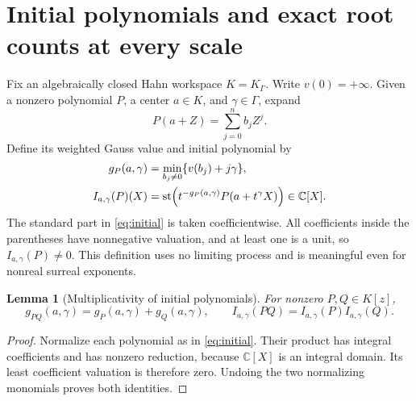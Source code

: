 \documentclass[11pt,letterpaper,oneside]{article}
\numberwithin{equation}{section}
\newtheorem{lemma}[theorem]{Lemma}
\theoremstyle{definition}
\theoremstyle{remark}\newtheorem{remark}[theorem]{Remark}
\newcommand{\C}{\mathbb C}\newcommand{\R}{\mathbb R}\newcommand{\Q}{\mathbb Q}
\begin{document}
\section{Initial polynomials and exact root counts at every scale}\label{sec:newton}
Fix an algebraically closed Hahn workspace $K=K_\Gamma$. Write $v(0)=+\infty$.
Given a nonzero polynomial $P$, a center $a\in K$, and $\gamma\in\Gamma$,
expand
\[
 P(a+Z)=\sum_{j=0}^n b_j Z^j.
\]
Define its weighted Gauss value and initial polynomial by
\begin{align}
 g_P(a,\gamma)&=\min_{b_j\ne0}\{v(b_j)+j\gamma\},\label{eq:gaussvalue}\\
 I_{a,\gamma}(P)(X)&=\st\!\left(t^{-g_P(a,\gamma)}P(a+t^\gamma X)\right)
 \in\C[X].\label{eq:initial}
\end{align}
The standard part in \eqref{eq:initial} is taken coefficientwise. All
coefficients inside the parentheses have nonnegative valuation, and at
least one is a unit, so $I_{a,\gamma}(P)\ne0$. This definition uses no
limiting process and is meaningful even for nonreal surreal exponents.

\begin{lemma}[Multiplicativity of initial polynomials]\label{lem:gaussproduct}
For nonzero $P,Q\in K[z]$,
\[
 g_{PQ}(a,\gamma)=g_P(a,\gamma)+g_Q(a,\gamma),\qquad
 I_{a,\gamma}(PQ)=I_{a,\gamma}(P)I_{a,\gamma}(Q).
\]
\end{lemma}
\begin{proof}
Normalize each polynomial as in \eqref{eq:initial}. Their product has
integral coefficients and has nonzero reduction, because $\C[X]$ is an
integral domain. Its least coefficient valuation is therefore zero.
Undoing the two normalizing monomials proves both identities.
\end{proof}
\end{document}
